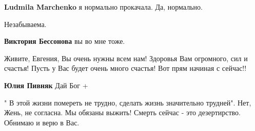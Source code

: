 \begin{itemize}
\begin{itemize}
\textbf{Ludmila Marchenko} я нормально прокачала. Да, нормально.
\end{itemize}

 
Незабываема.

\begin{itemize}
 
\textbf{Виктория Бессонова} вы во мне тоже.
\end{itemize}

 

Живите, Евгения, Вы очень нужны всем нам! Здоровья Вам огромного, сил и
счастья! Пусть у Вас будет очень много счастья! Вот прям начиная с сейчас!!

\begin{itemize}
 
\textbf{Юлия Пивняк} Дай Бог +
\end{itemize}

 

" В этой жизни помереть не трудно, сделать жизнь значительно трудней". Нет,
Жень, не согласна. Мы обязаны выжить! Смерть сейчас - это дезертирство. Обнимаю
и верю в Вас.

\begin{itemize}
 

\end{itemize}
\end{itemize}
